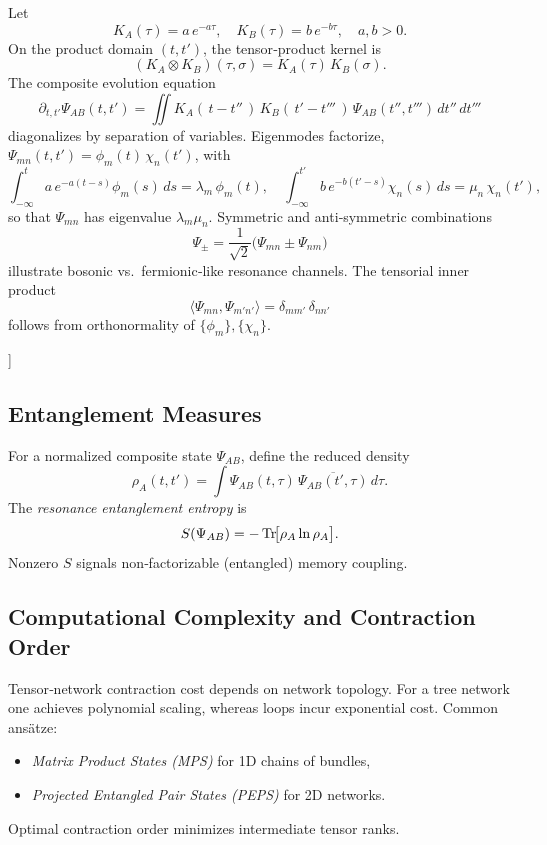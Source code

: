 Let
\[
  K_{A}(\tau)=a\,e^{-a\tau},\quad
  K_{B}(\tau)=b\,e^{-b\tau},
  \quad a,b>0.
\]
On the product domain \((t,t')\), the tensor‐product kernel is
\[
  (K_{A}\otimes K_{B})(\tau,\sigma)
  = K_{A}(\tau)\,K_{B}(\sigma).
\]
The composite evolution equation
\[
  \partial_{t,t'}\Psi_{AB}(t,t')
  = \iint K_{A}(\,t-t''\,)\,K_{B}(\,t'-t'''\,) \,
      \Psi_{AB}(t'',t''')\,dt''\,dt'''
\]
diagonalizes by separation of variables.  Eigenmodes factorize,
\(\Psi_{mn}(t,t')=\phi_{m}(t)\,\chi_{n}(t')\),
with
\[
  \int_{-\infty}^{t}a\,e^{-a(t-s)}\phi_{m}(s)\,ds
  = \lambda_{m}\,\phi_{m}(t),
  \quad
  \int_{-\infty}^{t'}b\,e^{-b(t'-s)}\chi_{n}(s)\,ds
  = \mu_{n}\,\chi_{n}(t'),
\]
so that
\(\Psi_{mn}\) has eigenvalue \(\lambda_{m}\mu_{n}\).  Symmetric and anti‐symmetric combinations
\[
  \Psi_{\pm}
  = \frac{1}{\sqrt2}\bigl(\Psi_{mn}\pm\Psi_{nm}\bigr)
\]
illustrate bosonic vs.\ fermionic‐like resonance channels.  The tensorial inner product
\[
  \bigl\langle\Psi_{mn},\Psi_{m'n'}\bigr\rangle
  = \delta_{mm'}\,\delta_{nn'}
\]
follows from orthonormality of \(\{\phi_{m}\},\{\chi_{n}\}\).

]
\subsection{Entanglement Measures}

For a normalized composite state \(\Psi_{AB}\), define the reduced density
\[
  \rho_{A}(t,t') = \int \Psi_{AB}(t,\tau)\,\overline{\Psi_{AB}(t',\tau)}\,d\tau.
\]
The \emph{resonance entanglement entropy} is
\[
  S(\Psi_{AB})
  = -\Tr\!\bigl[\rho_{A}\ln\rho_{A}\bigr].
\]
Nonzero \(S\) signals non‐factorizable (entangled) memory coupling.

\subsection{Computational Complexity and Contraction Order}

Tensor‐network contraction cost depends on network topology.  For a tree network one achieves polynomial scaling, whereas loops incur exponential cost.  Common ansätze:

\begin{itemize}
  \item \emph{Matrix Product States (MPS)} for 1D chains of bundles,
  \item \emph{Projected Entangled Pair States (PEPS)} for 2D networks.
\end{itemize}

Optimal contraction order minimizes intermediate tensor ranks.

